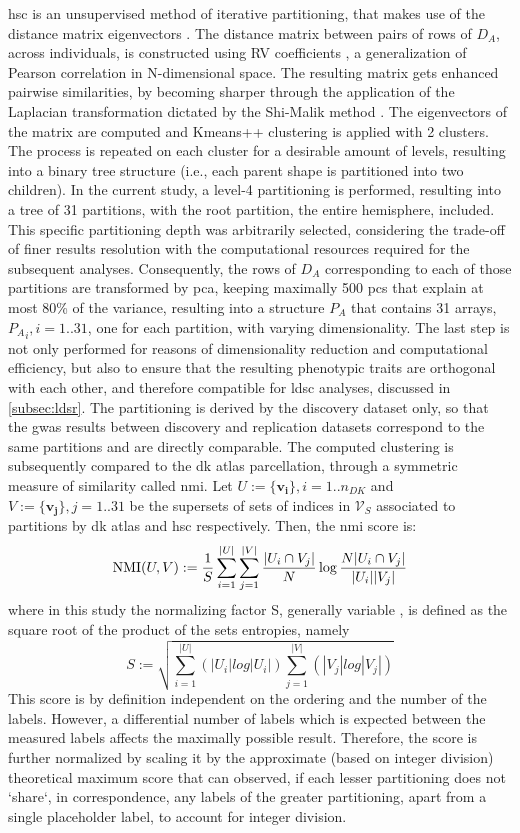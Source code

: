 \Ac{hsc} is an unsupervised method of iterative partitioning, that makes use of the distance matrix eigenvectors \cite{Ng2002}. The distance matrix between pairs of rows of $D_A$, across individuals, is constructed using RV coefficients \cite{Robert1976}, a generalization of Pearson correlation in N-dimensional space. The resulting matrix gets enhanced pairwise similarities, by becoming sharper through the application of the Laplacian transformation dictated by the Shi-Malik method \cite{Shi2000}. The eigenvectors of the matrix are computed and Kmeans++ clustering \cite{Arthur2007} is applied with 2 clusters. The process is repeated on each cluster for a desirable amount of levels, resulting into a binary tree structure (i.e., each parent shape is partitioned into two children). In the current study, a level-4 partitioning is performed, resulting into a tree of 31 partitions, with the root partition, the entire hemisphere, included. This specific partitioning depth was arbitrarily selected, considering the trade-off of finer results resolution with the computational resources required for the subsequent analyses. Consequently, the rows of $D_A$ corresponding to each of those partitions are transformed by \ac{pca}, keeping maximally 500 \acp{pc} that explain at most 80\% of the variance, resulting into a structure $P_A$ that contains 31 arrays, ${P_A}_i,i=1..31$, one for each partition, with varying dimensionality. The last step is not only performed for reasons of dimensionality reduction and computational efficiency, but also to ensure that the resulting phenotypic traits are orthogonal with each other, and therefore compatible for \ac{ldsc} analyses, discussed in \autoref{subsec:ldsr}. The partitioning is derived by the discovery dataset only, so that the \ac{gwas} results between discovery and replication datasets correspond to the same partitions and are directly comparable. The computed clustering is subsequently compared to the \ac{dk} atlas parcellation, through a symmetric measure of similarity called \ac{nmi}. Let $U:=\{\mathbf{v_i}\},i=1..n_{DK}$ and $V:=\{\mathbf{{v_j}}\},j=1..31$ be the supersets of sets of indices in $\mathcal{V}_S$ associated to partitions by \ac{dk} atlas and  \ac{hsc} respectively. Then, the \ac{nmi} score is:
$$
\operatorname*{NMI}(U,V):=\frac{1}{S}\sum_{i=1}^{|U|} \sum_{j=1}^{|V|} \frac{|U_i\cap V_j|}{N}
\log\frac{N|U_i \cap V_j|}{|U_i||V_j|}
$$
where in this study the normalizing factor S, generally variable \cite{Strehl2003}, is defined as the square root of the product of the sets entropies, namely  
$$
S:=\sqrt{\sum_{i=1}^{|U|}\left(|U_i|log|U_i|\right)\sum_{j=1}^{|V|}\left(|V_j|log|V_j|\right)}
$$
This score is by definition independent on the ordering and the number of the labels. However, a differential number of labels which is expected between the measured labels affects the maximally possible result. Therefore, the score is further normalized by scaling it by the approximate (based on integer division) theoretical maximum score that can observed, if each lesser partitioning does not `share`, in correspondence, any labels of the greater partitioning, apart from a single placeholder label, to account for integer division.
